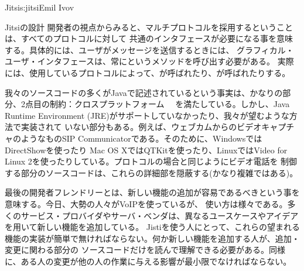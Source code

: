 \begin{aosachapter}{Jitsi}{s:jitsi}{Emil Ivov}
\begin{aosasect1}{Jitsiの設計}
開発者の視点からみると、マルチプロトコルを採用するということは、すべてのプロトコルに対して
共通のインタフェースが必要になる事を意味する。具体的には、ユーザがメッセージを送信するときには、
グラフィカル・ユーザ・インタフェースは、常にというメソッドを呼び出す必要がある。
実際には、使用しているプロトコルによって、が呼ばれたり、が呼ばれたりする。

我々のソースコードの多くがJavaで記述されているという事実は、かなりの部分、2点目の制約：クロスプラットフォーム　
を満たしている。しかし、Java Runtime Environment (JRE)がサポートしていなかったり、我々が望むような方法で実装されて
いない部分もある。例えば、ウェブカムからのビデオキャプチャのようなものSIP Communicatorである。そのために、WindowsではDirectShowを使ったり
Mac OS XではQTKitを使ったり、LinuxではVideo for Linux 2を使ったりしている。プロトコルの場合と同じようにビデオ電話を
制御する部分のソースコードは、これらの詳細部を隠蔽する(かなり複雑ではある)。

最後の開発者フレンドリーとは、新しい機能の追加が容易であるべきという事を意味する。今日、大勢の人々がVoIPを使っているが、
使い方は様々である。多くのサービス・プロバイダやサーバ・ベンダは、異なるユースケースやアイデアを用いて新しい機能を追加している。
Jistiを使う人にとって、これらの望まれる機能の実装が簡単で無ければならない。何か新しい機能を追加する人が、追加・変更に関わる部分の
ソースコードだけを読んで理解できる必要がある。同様に、ある人の変更が他の人の作業に与える影響が最小限でなければならない。


\end{aosasect1}
\end{aosachapter}
